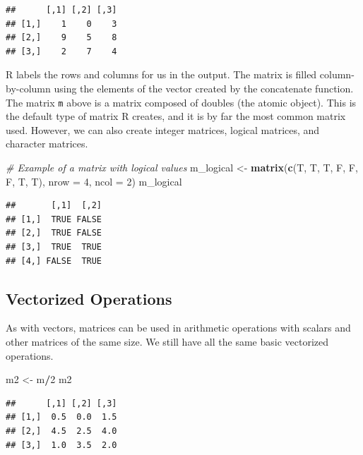 \documentclass[
]{book}
\newenvironment{Shaded}{\begin{snugshade}}{\end{snugshade}}
\newcommand{\CommentTok}[1]{\textcolor[rgb]{0.56,0.35,0.01}{\textit{#1}}}
\newcommand{\DataTypeTok}[1]{\textcolor[rgb]{0.13,0.29,0.53}{#1}}
\newcommand{\DecValTok}[1]{\textcolor[rgb]{0.00,0.00,0.81}{#1}}
\newcommand{\KeywordTok}[1]{\textcolor[rgb]{0.13,0.29,0.53}{\textbf{#1}}}
\newcommand{\NormalTok}[1]{#1}
\newcommand{\OperatorTok}[1]{\textcolor[rgb]{0.81,0.36,0.00}{\textbf{#1}}}
\newcommand{\StringTok}[1]{\textcolor[rgb]{0.31,0.60,0.02}{#1}}
\begin{document}
\begin{verbatim}
##      [,1] [,2] [,3]
## [1,]    1    0    3
## [2,]    9    5    8
## [3,]    2    7    4
\end{verbatim}

R labels the rows and columns for us in the output. The matrix is filled column-by-column using the elements of the vector created by the concatenate function. The matrix \texttt{m} above is a matrix composed of doubles (the atomic object). This is the default type of matrix R creates, and it is by far the most common matrix used. However, we can also create integer matrices, logical matrices, and character matrices.

\begin{Shaded}
\begin{Highlighting}[]
\CommentTok{# Example of a matrix with logical values}
\NormalTok{m_logical <-}\StringTok{ }\KeywordTok{matrix}\NormalTok{(}\KeywordTok{c}\NormalTok{(T, T, T, F, F, F, T, T), }\DataTypeTok{nrow =} \DecValTok{4}\NormalTok{, }\DataTypeTok{ncol =} \DecValTok{2}\NormalTok{)}
\NormalTok{m_logical}
\end{Highlighting}
\end{Shaded}

\begin{verbatim}
##       [,1]  [,2]
## [1,]  TRUE FALSE
## [2,]  TRUE FALSE
## [3,]  TRUE  TRUE
## [4,] FALSE  TRUE
\end{verbatim}

\hypertarget{vectorized-operations}{%
\subsection{Vectorized Operations}\label{vectorized-operations}}

As with vectors, matrices can be used in arithmetic operations with scalars and other matrices of the same size. We still have all the same basic vectorized operations.

\begin{Shaded}
\begin{Highlighting}[]
\NormalTok{m2 <-}\StringTok{ }\NormalTok{m}\OperatorTok{/}\DecValTok{2}
\NormalTok{m2}
\end{Highlighting}
\end{Shaded}

\begin{verbatim}
##      [,1] [,2] [,3]
## [1,]  0.5  0.0  1.5
## [2,]  4.5  2.5  4.0
## [3,]  1.0  3.5  2.0
\end{verbatim}
\end{document}
